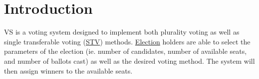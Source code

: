 \hypertarget{index_intro_sec}{}\section{Introduction}\label{index_intro_sec}
VS is a voting system designed to implement both plurality voting as well as single transferable voting (\mbox{\hyperlink{class_s_t_v}{S\+TV}}) methods. \mbox{\hyperlink{class_election}{Election}} holders are able to select the parameters of the election (ie. number of candidates, number of available seats, and number of ballots cast) as well as the desired voting method. The system will then assign winners to the available seats. 